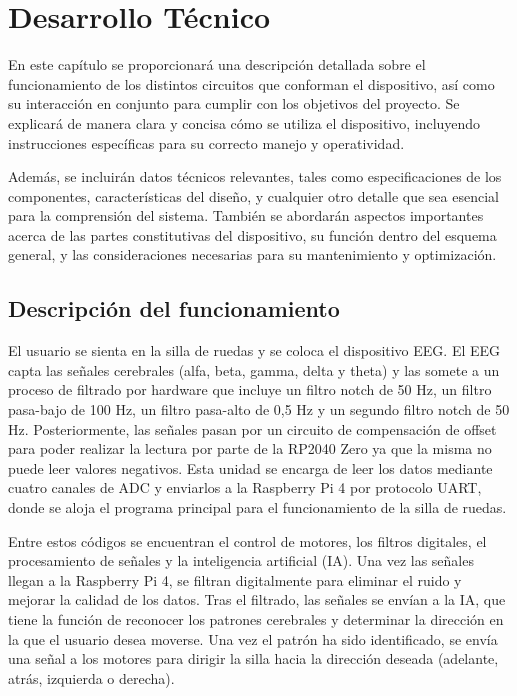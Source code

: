 \documentclass{article}
\begin{document}
\section{Desarrollo Técnico}
En este capítulo se proporcionará una descripción detallada sobre el funcionamiento de los distintos circuitos que conforman el dispositivo, así como su interacción en conjunto para cumplir con los objetivos del proyecto. Se explicará de manera clara y concisa cómo se utiliza el dispositivo, incluyendo instrucciones específicas para su correcto manejo y operatividad.

Además, se incluirán datos técnicos relevantes, tales como especificaciones de los componentes, características del diseño, y cualquier otro detalle que sea esencial para la comprensión del sistema. También se abordarán aspectos importantes acerca de las partes constitutivas del dispositivo, su función dentro del esquema general, y las consideraciones necesarias para su mantenimiento y optimización.

\subsection{Descripción del funcionamiento}
El usuario se sienta en la silla de ruedas y se coloca el dispositivo EEG. El EEG capta las señales cerebrales (alfa, beta, gamma, delta y theta) y las somete a un proceso de filtrado por hardware que incluye un filtro notch de 50 Hz, un filtro pasa-bajo de 100 Hz, un filtro pasa-alto de 0,5 Hz y un segundo filtro notch de 50 Hz. Posteriormente, las señales pasan por un circuito de compensación de offset para poder realizar la lectura por parte de la RP2040 Zero ya que la misma no puede leer valores negativos. Esta unidad se encarga de leer los datos mediante cuatro canales de ADC y enviarlos a la Raspberry Pi 4 por protocolo UART, donde se aloja el programa principal para el funcionamiento de la silla de ruedas.

Entre estos códigos se encuentran el control de motores, los filtros digitales, el procesamiento de señales y la inteligencia artificial (IA). Una vez las señales llegan a la Raspberry Pi 4, se filtran digitalmente para eliminar el ruido y mejorar la calidad de los datos. Tras el filtrado, las señales se envían a la IA, que tiene la función de reconocer los patrones cerebrales y determinar la dirección en la que el usuario desea moverse. Una vez el patrón ha sido identificado, se envía una señal a los motores para dirigir la silla hacia la dirección deseada (adelante, atrás, izquierda o derecha).
\end{document}
